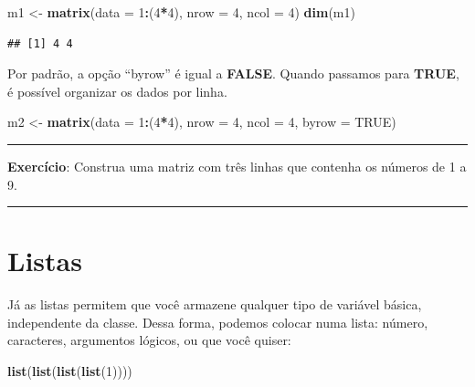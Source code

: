 \documentclass[]{book}
\newenvironment{Shaded}{\begin{snugshade}}{\end{snugshade}}
\newcommand{\KeywordTok}[1]{\textcolor[rgb]{0.13,0.29,0.53}{\textbf{#1}}}
\newcommand{\DataTypeTok}[1]{\textcolor[rgb]{0.13,0.29,0.53}{#1}}
\newcommand{\DecValTok}[1]{\textcolor[rgb]{0.00,0.00,0.81}{#1}}
\newcommand{\StringTok}[1]{\textcolor[rgb]{0.31,0.60,0.02}{#1}}
\newcommand{\OtherTok}[1]{\textcolor[rgb]{0.56,0.35,0.01}{#1}}
\newcommand{\OperatorTok}[1]{\textcolor[rgb]{0.81,0.36,0.00}{\textbf{#1}}}
\newcommand{\NormalTok}[1]{#1}
\theoremstyle{definition}
\theoremstyle{definition}
\theoremstyle{definition}
\theoremstyle{remark}
\begin{document}
\begin{Shaded}
\begin{Highlighting}[]
\NormalTok{m1 <-}\StringTok{ }\KeywordTok{matrix}\NormalTok{(}\DataTypeTok{data =} \DecValTok{1}\OperatorTok{:}\NormalTok{(}\DecValTok{4}\OperatorTok{*}\DecValTok{4}\NormalTok{), }\DataTypeTok{nrow =} \DecValTok{4}\NormalTok{, }\DataTypeTok{ncol =} \DecValTok{4}\NormalTok{)}
\KeywordTok{dim}\NormalTok{(m1)}
\end{Highlighting}
\end{Shaded}

\begin{verbatim}
## [1] 4 4
\end{verbatim}

Por padrão, a opção ``byrow'' é igual a \textbf{FALSE}. Quando passamos
para \textbf{TRUE}, é possível organizar os dados por linha.

\begin{Shaded}
\begin{Highlighting}[]
\NormalTok{m2 <-}\StringTok{ }\KeywordTok{matrix}\NormalTok{(}\DataTypeTok{data =} \DecValTok{1}\OperatorTok{:}\NormalTok{(}\DecValTok{4}\OperatorTok{*}\DecValTok{4}\NormalTok{), }\DataTypeTok{nrow =} \DecValTok{4}\NormalTok{, }\DataTypeTok{ncol =} \DecValTok{4}\NormalTok{, }\DataTypeTok{byrow =} \OtherTok{TRUE}\NormalTok{)}
\end{Highlighting}
\end{Shaded}

\begin{center}\rule{0.5\linewidth}{\linethickness}\end{center}

{\textbf{Exercício}: Construa uma matriz com três linhas que contenha os
números de 1 a 9.}

\begin{center}\rule{0.5\linewidth}{\linethickness}\end{center}

\section{Listas}\label{listas}

Já as listas permitem que você armazene qualquer tipo de variável
básica, independente da classe. Dessa forma, podemos colocar numa lista:
número, caracteres, argumentos lógicos, ou que você quiser:

\begin{Shaded}
\begin{Highlighting}[]
\KeywordTok{list}\NormalTok{(}\KeywordTok{list}\NormalTok{(}\KeywordTok{list}\NormalTok{(}\KeywordTok{list}\NormalTok{(}\DecValTok{1}\NormalTok{))))}
\end{Highlighting}
\end{Shaded}
\end{document}
